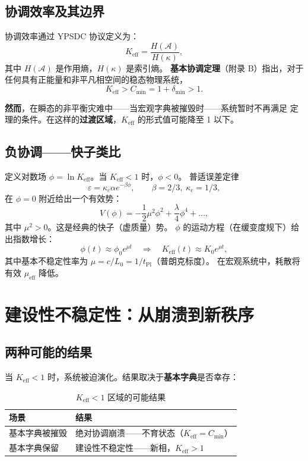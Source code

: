 \documentclass[12pt,a4paper]{article}
\newcommand{\Keff}{K_{\mathrm{eff}}}
\begin{document}
	\subsection{协调效率及其边界}
	
	协调效率通过 YPSDC 协议定义为：
	\[
	\Keff = \frac{H(\mathcal{A})}{H(\kappa)},
	\]
	其中 $H(\mathcal{A})$ 是作用熵，$H(\kappa)$ 是索引熵。
	\textbf{基本协调定理}（附录 B）指出，对于任何具有正能量和非平凡相空间的稳态物理系统，
	\[
	\Keff > C_{\min} = 1 + \delta_{\min} > 1.
	\]
	
	\textbf{然而}，在瞬态的非平衡灾难中——当宏观字典被摧毁时——系统暂时不再满足
	定理的条件。在这样的\textbf{过渡区域}，$\Keff$ 的形式值可能降至 1 以下。
	
	\subsection{负协调——快子类比}
	
	定义对数场 $\phi = \ln \Keff$。当 $\Keff < 1$ 时，$\phi < 0$。
	普适误差定律
	\[
	\varepsilon = \kappa_c \alpha e^{-\beta \phi}, \qquad \beta = 2/3,\; \kappa_c = 1/3,
	\]
	在 $\phi = 0$ 附近给出一个有效势：
	\[
	V(\phi) = -\frac{1}{2}\mu^2 \phi^2 + \frac{\lambda}{4}\phi^4 + \dots,
	\]
	其中 $\mu^2 > 0$。这是经典的快子（虚质量）势。
	$\phi$ 的运动方程（在缓变度规下）给出指数增长：
	\[
	\phi(t) \approx \phi_0 e^{\mu t} \quad\Longrightarrow\quad \Keff(t) \approx K_0 e^{\mu t},
	\]
	其中基本不稳定性率为 $\mu = c/L_0 = 1/t_{\mathrm{Pl}}$（普朗克标度）。
	在宏观系统中，耗散将有效 $\mu_{\mathrm{eff}}$ 降低。
	
	\section{建设性不稳定性：从崩溃到新秩序}
	
	\subsection{两种可能的结果}
	
	当 $\Keff < 1$ 时，系统被迫演化。结果取决于\textbf{基本字典}是否幸存：
	
	\begin{table}[H]
		\centering
		\caption{$\Keff < 1$ 区域的可能结果}
		\begin{tabular}{p{5cm}p{8cm}}
			\toprule
			\textbf{场景} & \textbf{结果} \\
			\midrule
			基本字典被摧毁 & 绝对协调崩溃——不育状态（$\Keff = C_{\min}$） \\
			基本字典保留 & 建设性不稳定性——新相，$\Keff > 1$ \\
			\bottomrule
		\end{tabular}
	\end{table}
	
\end{document}

